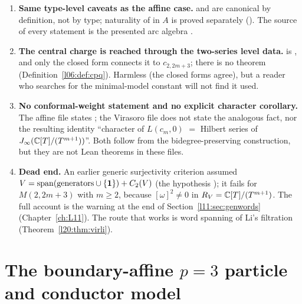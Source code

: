 \begin{warning}[title={Points a referee should know about the Virasoro companion}]
\begin{enumerate}
\item \textbf{Same type-level caveats as the affine case.}  and  are canonical by
  definition, not by type; naturality of  in $A$ is proved separately
  ().
  The source of every statement is the presented arc algebra .
\item \textbf{The central charge is reached through the two-series level data.}  is , and
  only the closed form  connects it to $c_{2,2m+3}$; there is no theorem
   (Definition~\ref{l06:def:cpq}). Harmless (the closed forms agree), but a
  reader who searches for the minimal-model constant will not find it used.
\item \textbf{No conformal-weight statement and no explicit character corollary.} The affine file states
  ; the Virasoro file does not state the analogous fact, nor the resulting identity
  ``character of $L(c_m,0)$ $=$ Hilbert series of $J_\infty({\mathbb{C}}[T]/(T^{m+1}))$''. Both follow from the bidegree-preserving
  construction, but they are not Lean theorems in these files.
\item \textbf{Dead end.} An earlier generic surjectivity criterion assumed
  $V=\operatorname{span}(\text{generators}\cup\{\mathbf{1}\})+C_2(V)$ (the hypothesis ); it fails for
  $M(2,2m+3)$ with $m\ge2$, because $[\omega]^2\neq0$ in $R_V={\mathbb{C}}[T]/(T^{m+1})$. The full account is the warning at the end of
  Section~\ref{l11:sec:genwords} (Chapter~\ref{ch:L11}). The route that works is word spanning of Li's filtration
  (Theorem~\ref{l20:thm:virli}).
\end{enumerate}
\end{warning}

\section{The boundary-affine \texorpdfstring{$p=3$}{p=3} particle and conductor model}\label{l20:sec:p3}

